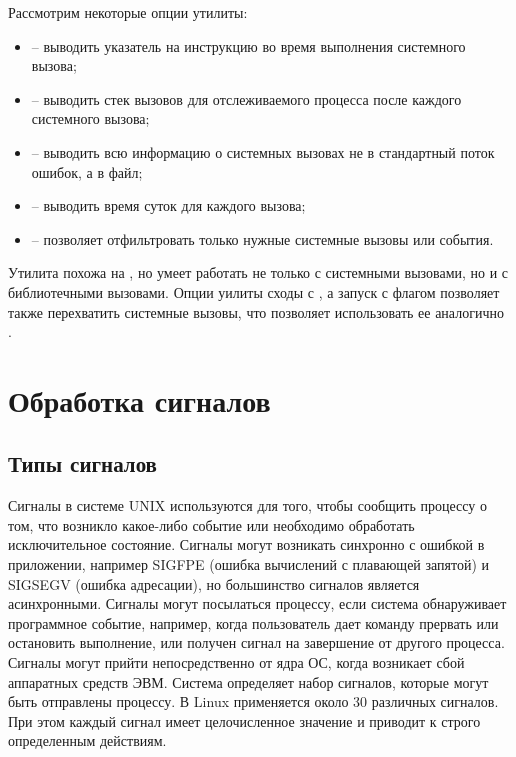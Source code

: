 Рассмотрим некоторые опции утилиты:
\begin{itemize}
	\item {} -- выводить указатель на инструкцию во время выполнения системного вызова;
  \item {} -- выводить стек вызовов для отслеживаемого процесса после каждого системного вызова;
	\item {} -- выводить всю информацию о системных вызовах не в стандартный поток ошибок, а в файл;
	\item {} -- выводить время суток для каждого вызова;
	\item {} -- позволяет отфильтровать только нужные системные вызовы или события.
\end{itemize}

Утилита  похожа на , но умеет работать не только с системными вызовами, но и с библиотечными вызовами. Опции уилиты сходы с , а запуск с флагом  позволяет также перехватить системные вызовы, что позволяет использовать ее аналогично .

\section{Обработка сигналов}

\subsection{Типы сигналов}

Сигналы в системе UNIX  используются для того, чтобы сообщить процессу о том, что возникло какое-либо событие или необходимо обработать исключительное состояние. Сигналы могут возникать синхронно с ошибкой в приложении, например SIGFPE (ошибка вычислений с плавающей запятой) и SIGSEGV (ошибка адресации), но большинство сигналов является асинхронными. Сигналы могут посылаться процессу, если система обнаруживает программное событие, например, когда пользователь дает команду прервать или остановить выполнение, или получен сигнал на завершение от другого процесса. Сигналы могут прийти непосредственно от ядра ОС, когда возникает сбой аппаратных средств ЭВМ. Система определяет набор сигналов, которые могут быть отправлены процессу. В Linux применяется около 30 различных сигналов. При этом каждый сигнал имеет целочисленное значение и приводит к строго определенным действиям.

